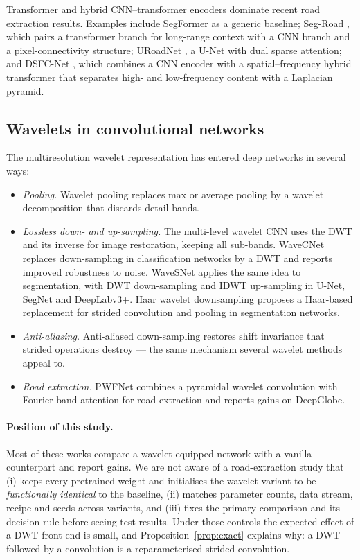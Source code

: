 \documentclass[11pt]{article}
\begin{document}
Transformer and hybrid CNN--transformer encoders dominate recent road extraction results.
Examples include SegFormer \cite{xie2021segformer} as a generic baseline; Seg-Road \cite{tao2023},
which pairs a transformer branch for long-range context with a CNN branch and a pixel-connectivity
structure; URoadNet \cite{uroadnet2024}, a U-Net with dual sparse attention; and DSFC-Net
\cite{zhang2026dsfc}, which combines a CNN encoder with a spatial--frequency hybrid transformer
that separates high- and low-frequency content with a Laplacian pyramid.

\subsection{Wavelets in convolutional networks}

The multiresolution wavelet representation \cite{mallat1989} has entered deep networks in several
ways:
\begin{itemize}
  \item \emph{Pooling.} Wavelet pooling \cite{williams2018} replaces max or average pooling by a
        wavelet decomposition that discards detail bands.
  \item \emph{Lossless down- and up-sampling.} The multi-level wavelet CNN \cite{liu2018mwcnn}
        uses the DWT and its inverse for image restoration, keeping all sub-bands. WaveCNet
        \cite{li2020wavecnet,li2021wavecnet} replaces down-sampling in classification networks by
        a DWT and reports improved robustness to noise. WaveSNet \cite{li2020wavesnet} applies the
        same idea to segmentation, with DWT down-sampling and IDWT up-sampling in U-Net, SegNet and
        DeepLabv3+. Haar wavelet downsampling \cite{xu2023hwd} proposes a Haar-based replacement for
        strided convolution and pooling in segmentation networks.
  \item \emph{Anti-aliasing.} Anti-aliased down-sampling \cite{zhang2019} restores shift
        invariance that strided operations destroy --- the same mechanism several wavelet methods
        appeal to.
  \item \emph{Road extraction.} PWFNet \cite{zong2025pwfnet} combines a pyramidal wavelet
        convolution with Fourier-band attention for road extraction and reports gains on DeepGlobe.
\end{itemize}

\paragraph{Position of this study.} Most of these works compare a wavelet-equipped network with a
vanilla counterpart and report gains. We are not aware of a road-extraction study that
(i) keeps every pretrained weight and initialises the wavelet variant to be \emph{functionally
identical} to the baseline, (ii) matches parameter counts, data stream, recipe and seeds across
variants, and (iii) fixes the primary comparison and its decision rule before seeing test results.
Under those controls the expected effect of a DWT front-end is small, and
Proposition~\ref{prop:exact} explains why: a DWT followed by a convolution is a reparameterised
strided convolution.
\end{document}
